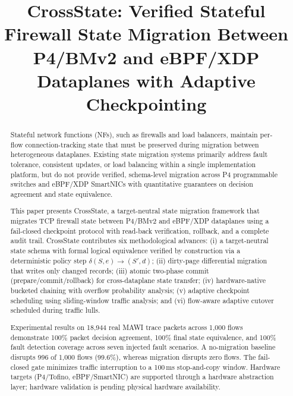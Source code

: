 \documentclass[10pt, conference]{IEEEtran}
\begin{document}
\title{CrossState: Verified Stateful Firewall State Migration Between P4/BMv2 and eBPF/XDP Dataplanes with Adaptive Checkpointing}

\author{
}

\maketitle

\begin{abstract}
Stateful network functions (NFs), such as firewalls and load balancers, maintain per-flow connection-tracking state that must be preserved during migration between heterogeneous dataplanes. Existing state migration systems primarily address fault tolerance, consistent updates, or load balancing within a single implementation platform, but do not provide verified, schema-level migration across P4 programmable switches and eBPF/XDP SmartNICs with quantitative guarantees on decision agreement and state equivalence.

This paper presents CrossState, a target-neutral state migration framework that migrates TCP firewall state between P4/BMv2 and eBPF/XDP dataplanes using a fail-closed checkpoint protocol with read-back verification, rollback, and a complete audit trail. CrossState contributes six methodological advances: (i) a target-neutral state schema with formal logical equivalence verified by construction via a deterministic policy step $\delta(S,e)\rightarrow(S',d)$; (ii) dirty-page differential migration that writes only changed records; (iii) atomic two-phase commit (prepare/commit/rollback) for cross-dataplane state transfer; (iv) hardware-native bucketed chaining with overflow probability analysis; (v) adaptive checkpoint scheduling using sliding-window traffic analysis; and (vi) flow-aware adaptive cutover scheduled during traffic lulls.

Experimental results on 18{,}944 real MAWI trace packets across 1{,}000 flows demonstrate 100\% packet decision agreement, 100\% final state equivalence, and 100\% fault detection coverage across seven injected fault scenarios. A no-migration baseline disrupts 996 of 1{,}000 flows (99.6\%), whereas migration disrupts zero flows. The fail-closed gate minimizes traffic interruption to a 100\,ms stop-and-copy window. Hardware targets (P4/Tofino, eBPF/SmartNIC) are supported through a hardware abstraction layer; hardware validation is pending physical hardware availability.
\end{abstract}
\end{document}
